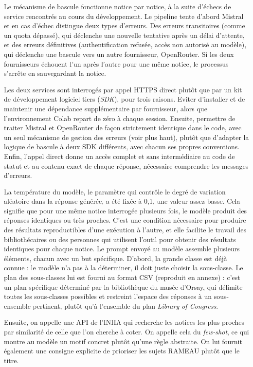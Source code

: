 Le mécanisme de bascule fonctionne notice par notice, à la suite d'échecs de service rencontrés au cours du développement. Le pipeline tente d'abord Mistral et en cas d'échec distingue deux types d'erreurs. Des erreurs transitoires (comme un quota dépassé), qui déclenche une nouvelle tentative après un délai d'attente, et des erreurs définitives (authentification refusée, accès non autorisé au modèle), qui déclenche une bascule vers un autre fournisseur, OpenRouter. Si les deux fournisseurs échouent l'un après l'autre pour une même notice, le processus s'arrête en sauvegardant la notice.

Les deux services sont interrogés par appel HTTPS direct plutôt que par un kit de développement logiciel tiers (\textit{SDK}), pour trois raisons. Eviter d'installer et de maintenir une dépendance supplémentaire par fournisseur, alors que l'environnement Colab repart de zéro à chaque session. Ensuite, permettre de traiter Mistral et OpenRouter de façon strictement identique dans le code, avec un seul mécanisme de gestion des erreurs (voir plus haut), plutôt que d'adapter la logique de bascule à deux SDK différents, avec chacun ses propres conventions. Enfin, l'appel direct donne un accès complet et sans intermédiaire au code de statut et au contenu exact de chaque réponse, nécessaire comprendre les messages d'erreurs.


La température du modèle, le paramètre qui contrôle le degré de variation aléatoire dans la réponse générée, a été fixée à 0,1, une valeur assez basse. Cela signifie que pour une même notice interrogée plusieurs fois, le modèle produit des réponses identiques ou très proches.
C'est une condition nécessaire pour produire des résultats reproductibles d'une exécution à l'autre, et elle facilite le travail des bibliothécaires ou des personnes qui utilisent l'outil pour obtenir des résultats identiques pour chaque notice.
Le prompt envoyé au modèle assemble plusieurs éléments, chacun avec un but spécifique. D'abord, la grande classe est déjà connue : le modèle n'a pas à la déterminer, il doit juste choisir la sous-classe. Le plan des sous-classes lui est fourni au format CSV (reproduit en annexe) : c'est un plan spécifique déterminé par la bibliothèque du musée d'Orsay, qui délimite toutes les sous-classes possibles et restreint l'espace des réponses à un sous-ensemble pertinent, plutôt qu'à l'ensemble du plan \textit{Library of Congress}.

Ensuite, on appelle une API de l'INHA qui recherche les notices les plus proches par similarité de celle que l'on cherche à coter. On appelle cela du \textit{few-shot}, ce qui montre au modèle un motif concret plutôt qu'une règle abstraite. On lui fournit également une consigne explicite de prioriser les sujets RAMEAU plutôt que le titre. 

